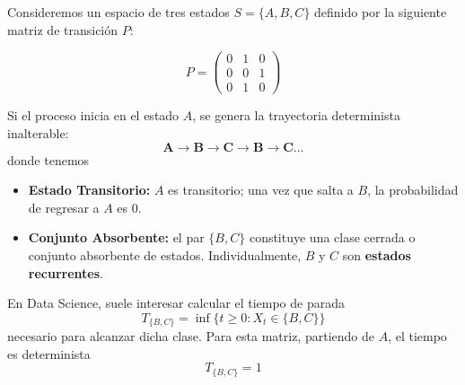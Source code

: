 \begin{ejemplo} 
    Consideremos un espacio de tres estados $S = \{A, B, C\}$ definido por la siguiente matriz de transición $P$:       \\
    \noindent
    \begin{minipage}{0.45\textwidth}
        \centering
        \[ 
        P =
        \begin{pmatrix} 
        0 & 1 & 0 \\ 
        0 & 0 & 1 \\ 
        0 & 1 & 0 
        \end{pmatrix} 
        \]
    \end{minipage}
    \begin{minipage}{0.5\textwidth}
        \centering
    \end{minipage}
    \vspace{0.4cm}

    \noindent 
    Si el proceso inicia en el estado $A$, se genera la trayectoria determinista inalterable: $$\boldsymbol{A \longrightarrow B \longrightarrow C \longrightarrow B \longrightarrow C \dots}$$
    donde tenemos
    \begin{itemize}
        \item \textbf{Estado Transitorio:} $A$ es transitorio; una vez que salta a $B$, la probabilidad de regresar a $A$ es $0$.
        \item \textbf{Conjunto Absorbente:} el par $\{B, C\}$ constituye una clase cerrada o conjunto absorbente de estados. Individualmente, $B$ y $C$ son \textbf{estados recurrentes}.
    \end{itemize}
    En Data Science, suele interesar calcular el tiempo de parada 
    $$T_{\{B,C\}} = \inf\{t \ge 0 : X_t \in \{B,C\}\}$$ 
    necesario para alcanzar dicha clase. Para esta matriz, partiendo de $A$, el tiempo es determinista
    $$T_{\{B,C\}} = 1$$
\end{ejemplo}

